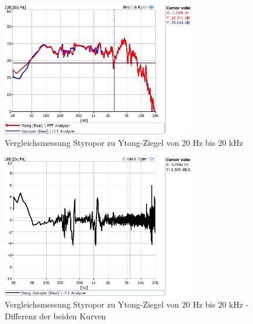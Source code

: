 \begin{figure} [H]
	\centering
	\includegraphics[width=0.75\textwidth]{img/Optimierung/Vergleich/VergleichYtognStyro_full.png}
	\caption{Vergleichsmessung Styropor zu Ytong-Ziegel von 20 Hz bis 20 kHz}
	\label{fig:4.4.1.1}
\end{figure}
\begin{figure} [H]
	\centering
	\includegraphics[width=0.75\textwidth]{img/Optimierung/Vergleich/VergleichYtognStyro_Abweichung_full.png}
	\caption{Vergleichsmessung Styropor zu Ytong-Ziegel von 20 Hz bis 20 kHz - Differenz der beiden Kurven}
	\label{fig:4.4.1.2}
\end{figure}


